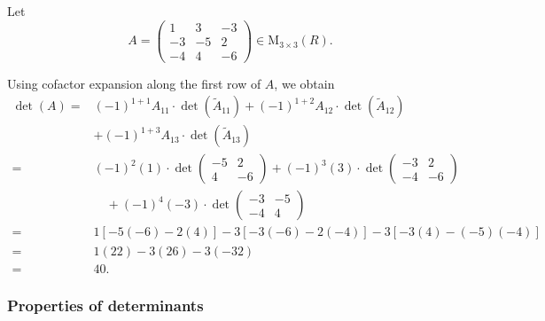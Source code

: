 \documentclass{report}
\begin{document}
    \begin{Example}
        Let
        $$
        A=\left(\begin{array}{rrr}
        1 & 3 & -3 \\
        -3 & -5 & 2 \\
        -4 & 4 & -6
        \end{array}\right) \in \mathrm{M}_{3 \times 3}(R) .
        $$

        Using cofactor expansion along the first row of $A$, we obtain
        $$
        \begin{aligned}
        \operatorname{det}(A)= & (-1)^{1+1} A_{11} \cdot \operatorname{det}\left(\tilde{A}_{11}\right)+(-1)^{1+2} A_{12} \cdot \operatorname{det}\left(\tilde{A}_{12}\right) \\
        & +(-1)^{1+3} A_{13} \cdot \operatorname{det}\left(\tilde{A}_{13}\right) \\
        = & (-1)^2(1) \cdot \operatorname{det}\left(\begin{array}{rr}
        -5 & 2 \\
        4 & -6
        \end{array}\right)+(-1)^3(3) \cdot \operatorname{det}\left(\begin{array}{rr}
        -3 & 2 \\
        -4 & -6
        \end{array}\right) \\
        & \quad+(-1)^4(-3) \cdot \operatorname{det}\left(\begin{array}{rr}
        -3 & -5 \\
        -4 & 4
        \end{array}\right) \\
        = & 1[-5(-6)-2(4)]-3[-3(-6)-2(-4)]-3[-3(4)-(-5)(-4)] \\
        = & 1(22)-3(26)-3(-32) \\
        = & 40 .
        \end{aligned}
        $$
    \end{Example}

    \subsubsection*{Properties of determinants}
\end{document}

